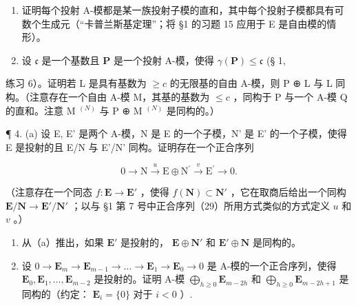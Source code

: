 \begin{enumerate}
\def\labelenumi{\arabic{enumi}.}
\setcounter{enumi}{1}
\item
  证明每个投射 A-模都是某一族投射子模的直和，其中每个投射子模都具有可数个生成元（“卡普兰斯基定理”；将 §1 的习题 15 应用于 E 是自由模的情形）。
\item
  设 \(\mathfrak{c}\) 是一个基数且 \(\mathbf{P}\) 是一个投射 A-模，使得 \(\gamma(\mathbf{P}) \leqslant \mathfrak{c}\) (§ 1,
\end{enumerate}

练习 6）。证明若 L 是具有基数为 \(\geqslant c\) 的无限基的自由 A-模，则 P ⊕ L 与 L 同构。（注意存在一个自由 A-模 M，其基的基数为 \(\leqslant c\) ，同构于 P 与一个 A-模 Q 的直和。注意 M \(^{(N)}\) 与 P ⊕ M \(^{(N)}\) 是同构的。）

¶ 4. (a) 设 E, E' 是两个 A-模，N 是 E 的一个子模，N' 是 E' 的一个子模，使得 E 是投射的且 E/N 与 E'/N' 同构。证明存在一个正合序列

\[
0 \longrightarrow \mathrm{N} \stackrel {u} {\longrightarrow} \mathrm{E} \oplus \mathrm{N} ^ {\prime} \stackrel {v} {\longrightarrow} \mathrm{E} ^ {\prime} \longrightarrow 0.
\]

（注意存在一个同态 \(f \colon \mathbf{E} \to \mathbf{E}'\) ，使得 \(f(\mathbf{N}) \subset \mathbf{N}'\) ，它在取商后给出一个同构 \(\mathbf{E} / \mathbf{N} \to \mathbf{E}' / \mathbf{N}'\) ；以与 §1 第 7 号中正合序列（29）所用方式类似的方式定义 \(u\) 和 \(v\) 。）

\begin{enumerate}
\def\labelenumi{(\alph{enumi})}
\setcounter{enumi}{1}
\item
  从（a）推出，如果 \(\mathbf{E}'\) 是投射的， \(\mathbf{E} \oplus \mathbf{N}'\) 和 \(\mathbf{E}' \oplus \mathbf{N}\) 是同构的。
\item
  设 \(0 \to \mathbf{E}_m \to \mathbf{E}_{m-1} \to \ldots \to \mathbf{E}_1 \to \mathbf{E}_0 \to 0\) 是 A-模的一个正合序列，使得 \(\mathbf{E}_0, \mathbf{E}_1, \ldots, \mathbf{E}_{m-2}\) 是投射的。证明 A-模 \(\bigoplus_{h \geqslant 0} \mathbf{E}_{m-2h}\) 和 \(\bigoplus_{h \geqslant 0} \mathbf{E}_{m-2h+1}\) 是同构的（约定： \(\mathbf{E}_i = \{0\}\) 对于 \(i < 0\) ）.
\end{enumerate}


